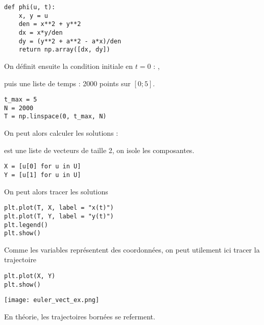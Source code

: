 \begin{enumerate}
\begin{lstlisting}
def phi(u, t):
    x, y = u
    den = x**2 + y**2
    dx = x*y/den
    dy = (y**2 + a**2 - a*x)/den
    return np.array([dx, dy])
\end{lstlisting}
\item On définit ensuite la condition initiale en $t=0$ : ,
\item puis une liste de temps : 2000 points sur $[0; 5]$.
\begin{lstlisting}
t_max = 5
N = 2000
T = np.linspace(0, t_max, N)
\end{lstlisting}
\item On peut alors calculer les solutions : 
\item {} est une liste de vecteurs de taille 2, on isole les composantes.
\begin{lstlisting}
X = [u[0] for u in U]
Y = [u[1] for u in U]
\end{lstlisting}
\item On peut alors tracer les solutions 
\begin{lstlisting}
plt.plot(T, X, label = "x(t)")
plt.plot(T, Y, label = "y(t)")
plt.legend()
plt.show()
\end{lstlisting}
\item Comme les variables représentent des coordonnées, on peut utilement ici tracer la trajectoire
\begin{lstlisting}
plt.plot(X, Y)
plt.show()
\end{lstlisting}
\begin{center}
\texttt{[image: euler\_vect\_ex.png]}
\end{center}
\begin{minipage}{0.60\linewidth}
\item En théorie, les trajectoires bornées se referment. 


\end{minipage}
\end{enumerate}
